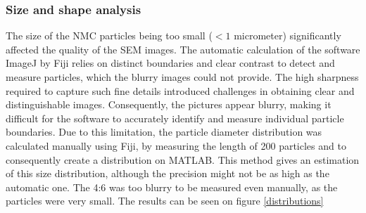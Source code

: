 \documentclass{article}
\begin{document}
\subsubsection{Size and shape analysis}
The size of the NMC particles being too small (\(<1\) micrometer) significantly affected 
the quality of the SEM images. The automatic calculation 
of the software ImageJ by Fiji relies on distinct boundaries 
and clear contrast to detect and measure particles, which the
 blurry images could not provide. The high sharpness required
  to capture such fine details introduced challenges in
   obtaining clear and distinguishable images. Consequently, 
   the pictures appear blurry, making it difficult for the 
   software to accurately identify and measure individual 
   particle boundaries. Due to this limitation, the particle
    diameter distribution was calculated manually using Fiji,
     by measuring the length of 200 particles and to 
     consequently create a distribution on MATLAB. 
     This method gives an estimation of this size 
     distribution, although the precision might not
      be as high as the automatic one. The 4:6 was too blurry
       to be measured even manually, as the particles were 
       very small. The results can be seen on figure \ref{distributions}\\
\end{document}
